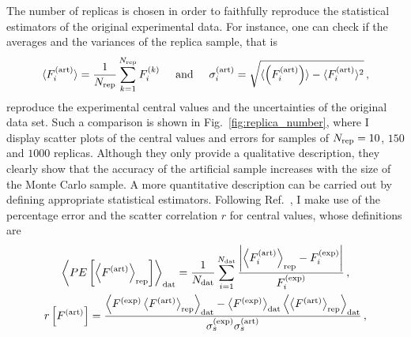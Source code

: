 %
%
The number of replicas is chosen in order to faithfully reproduce the statistical estimators of the original experimental data. For instance, one can check if the averages and the variances of the replica sample, that is
\begin{equation}
  \langle F_{i}^{\textrm{(art)}} \rangle = \frac{1}{N_{\textrm{rep}}} \sum_{k=1}^{N_{\textrm{rep}}} F_{i}^{(k)} \hspace{5mm} \textrm{and} \hspace*{5mm} \sigma_i^{\textrm{(art)}} = \sqrt{ \langle \left( F_{i}^{\textrm{(art)}} \right) \rangle - \langle F_{i}^{\textrm{(art)}} \rangle^2} \,,
\end{equation}
reproduce the experimental central values and the uncertainties of the original data set. Such a comparison is shown in Fig.~\ref{fig:replica_number}, where I display scatter plots of the central values and errors for samples of $N_{\textrm{rep}} = 10$, $150$ and $1000$ replicas. Although they only provide a qualitative description, they clearly show that the accuracy of the artificial sample increases with the size of the Monte Carlo sample. A more quantitative description can be carried out by defining appropriate statistical estimators. Following Ref.~\cite{DelDebbio:2004xtd}, I make use of the percentage error and the scatter correlation $r$ for central values, whose definitions are
%
\begin{gather}
  \left< PE \left[ \left< F^{(\textrm{art})} \right>_{\textrm{rep}} \right] \right>_{\textrm{dat}} = \frac{1}{N_{\textrm{dat}}} \sum_{i=1}^{N_{\textrm{dat}}} \frac{\abs{\left< F_i^{\textrm{(art)}} \right>_{\textrm{rep}} - F_{i}^{\textrm{(exp)}}}}{F_i^{\textrm{(exp)}}}\,, 
  \label{eq:PE}\\
  r \left[ F^{\textrm{(art)}} \right] = \frac{\left< F^{\textrm{(exp)}} \left< F^{\textrm{(art)}} \right>_{\textrm{rep}} \right>_{\textrm{dat}} - \left< F^{\textrm{(exp)}} \right>_{\textrm{dat}} \left<  \left< F^{\textrm{(art)}} \right>_{\textrm{rep}}\right>_{\textrm{dat}} }{\sigma_s^{\textrm{(exp)}} \sigma_s^{\textrm{(art)}} }\,,
  \label{eq:r}
\end{gather}
